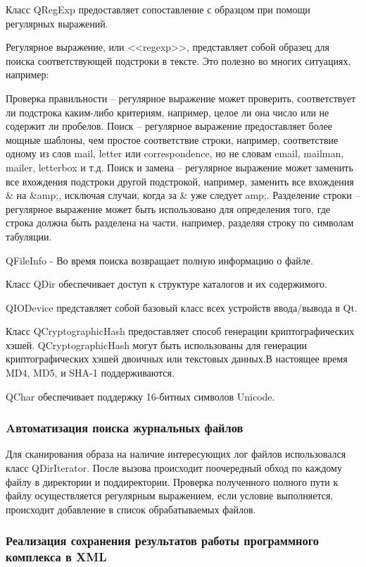 Класс QRegExp предоставляет сопоставление с образцом при помощи регулярных выражений.

Регулярное выражение, или <<regexp>>, представляет собой образец для поиска соответствующей подстроки в тексте. Это полезно во многих ситуациях, например:

Проверка правильности -- регулярное выражение может проверить, соответствует ли подстрока каким-либо критериям, например, целое ли она число или не содержит ли пробелов.
Поиск -- регулярное выражение предоставляет более мощные шаблоны, чем простое соответствие строки, например, соответствие одному из слов mail, letter или correspondence, но не словам email, mailman, mailer, letterbox и т.д.
Поиск и замена -- регулярное выражение может заменить все вхождения подстроки другой подстрокой, например, заменить все вхождения \& на \&amp;, исключая случаи, когда за \& уже следует amp;.
Разделение строки -- регулярное выражение может быть использовано для определения того, где строка должна быть разделена на части, например, разделяя строку по символам табуляции.

QFileInfo  - Во время поиска возвращает полную информацию о файле.

Класс QDir обеспечивает доступ к структуре каталогов и их содержимого.

QIODevice представляет собой базовый класс всех устройств ввода/вывода в Qt.

Класс QCryptographicHash предоставляет способ генерации криптографических хэшей.
QCryptographicHash могут быть использованы для генерации криптографических хэшей двоичных или текстовых данных.В настоящее время MD4, MD5, и SHA-1 поддерживаются. \cite{qtcross}

QChar обеспечивает поддержку 16-битных символов Unicode.

\subsubsection{Aвтоматизация поиска журнальных файлов}

Для сканирования образа на наличие интересующих лог файлов использовался класс QDirIterator. После вызова происходит поочередный обход по каждому файлу в директории и поддиректории. Проверка полученного полного пути к файлу осуществляется регулярным выражением, если условие выполняется, происходит добавление в список обрабатываемых файлов.

\subsubsection{Реализация сохранения результатов работы программного комплекса в XML}

